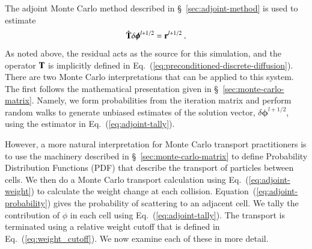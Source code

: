 \documentclass[preprint,12pt]{elsarticle}
\newcommand{\vr}{\ensuremath{\ve{r}}}
\newcommand{\bphi}{\ensuremath{\boldsymbol{\phi}}}
\begin{document}
The adjoint Monte Carlo method described in \S~\ref{sec:adjoint-method} is
used to estimate
\begin{equation}
  \hat{\ve{T}}\delta\bphi^{l+1/2} = \vr^{l+1/2}\:.
\end{equation}
As noted above, the residual acts as the source for this simulation, and the
operator $\mathbf{T}$ is implicitly defined in
Eq.~(\ref{eq:preconditioned-discrete-diffusion}).  There are two Monte Carlo
interpretations that can be applied to this system.  The first follows the
mathematical presentation given in \S~\ref{sec:monte-carlo-matrix}.  Namely,
we form probabilities from the iteration matrix and perform random walks to
generate unbiased estimates of the solution vector, $\delta\bphi^{l+1/2}$,
using the estimator in Eq.~(\ref{eq:adjoint-tally}).

However, a more natural interpretation for Monte Carlo transport practitioners
is to use the machinery described in \S~\ref{sec:monte-carlo-matrix} to define
Probability Distribution Functions (PDF) that describe the transport of
particles between cells.  We then do a Monte Carlo transport calculation using
Eq.~(\ref{eq:adjoint-weight}) to calculate the weight change at each
collision. Equation~(\ref{eq:adjoint-probability}) gives the probability of
scattering to an adjacent cell. We tally the contribution of $\phi$ in each
cell using Eq.~(\ref{eq:adjoint-tally}).  The transport is terminated using a
relative weight cutoff that is defined in Eq.~(\ref{eq:weight_cutoff}).  We
now examine each of these in more detail.
\end{document}
